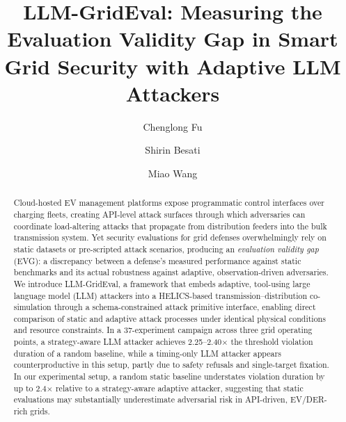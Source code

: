 \documentclass[sigconf,9pt]{acmart}
\begin{document}
\title{LLM-GridEval: Measuring the Evaluation Validity Gap in Smart Grid Security with Adaptive LLM Attackers}

\author{Chenglong Fu}

\author{Shirin Besati}

\author{Miao Wang}

\begin{abstract}
Cloud-hosted EV management platforms expose programmatic control interfaces over charging fleets, creating API-level attack surfaces through which adversaries can coordinate load-altering attacks that propagate from distribution feeders into the bulk transmission system.
Yet security evaluations for grid defenses overwhelmingly rely on static datasets or pre-scripted attack scenarios, producing an \emph{evaluation validity gap} (EVG): a discrepancy between a defense's measured performance against static benchmarks and its actual robustness against adaptive, observation-driven adversaries.
We introduce LLM-GridEval, a framework that embeds adaptive, tool-using large language model (LLM) attackers into a HELICS-based transmission--distribution co-simulation through a schema-constrained attack primitive interface, enabling direct comparison of static and adaptive attack processes under identical physical conditions and resource constraints.
In a 37-experiment campaign across three grid operating points, a strategy-aware LLM attacker achieves 2.25--2.40$\times$ the threshold violation duration of a random baseline, while a timing-only LLM attacker appears counterproductive in this setup, partly due to safety refusals and single-target fixation.
In our experimental setup, a random static baseline understates violation duration by up to 2.4$\times$ relative to a strategy-aware adaptive attacker, suggesting that static evaluations may substantially underestimate adversarial risk in API-driven, EV/DER-rich grids.
\end{abstract}

\maketitle








\balance



\appendix

\end{document}
